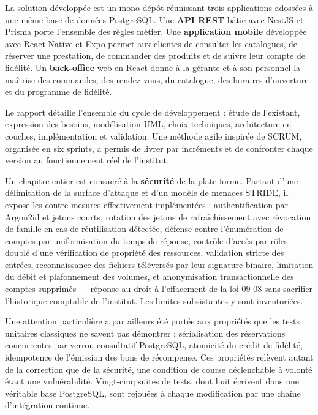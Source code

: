 \vspace{0.3cm}

La solution développée est un mono-dépôt réunissant trois applications
adossées à une même base de données PostgreSQL. Une \textbf{API REST} bâtie
avec NestJS et Prisma porte l'ensemble des règles métier. Une
\textbf{application mobile} développée avec React Native et Expo permet aux
clientes de consulter les catalogues, de réserver une prestation, de commander
des produits et de suivre leur compte de fidélité. Un \textbf{back-office} web
en React donne à la gérante et à son personnel la maîtrise des commandes, des
rendez-vous, du catalogue, des horaires d'ouverture et du programme de
fidélité.

\vspace{0.3cm}

Le rapport détaille l'ensemble du cycle de développement : étude de
l'existant, expression des besoins, modélisation UML, choix techniques,
architecture en couches, implémentation et validation. Une méthode agile
inspirée de SCRUM, organisée en six sprints, a permis de livrer par
incréments et de confronter chaque version au fonctionnement réel de
l'institut.

\vspace{0.3cm}

Un chapitre entier est consacré à la \textbf{sécurité} de la plate-forme.
Partant d'une délimitation de la surface d'attaque et d'un modèle de menaces
STRIDE, il expose les contre-mesures effectivement implémentées :
authentification par Argon2id et jetons courts, rotation des jetons de
rafraîchissement avec révocation de famille en cas de réutilisation détectée,
défense contre l'énumération de comptes par uniformisation du temps de réponse,
contrôle d'accès par rôles doublé d'une vérification de propriété des
ressources, validation stricte des entrées, reconnaissance des fichiers
téléversés par leur signature binaire, limitation du débit et plafonnement des
volumes, et anonymisation transactionnelle des comptes supprimés --- réponse au
droit à l'effacement de la loi 09-08 sans sacrifier l'historique comptable de
l'institut. Les limites subsistantes y sont inventoriées.

\vspace{0.3cm}

Une attention particulière a par ailleurs été portée aux propriétés que les
tests unitaires classiques ne savent pas démontrer : sérialisation des
réservations concurrentes par verrou consultatif PostgreSQL, atomicité du
crédit de fidélité, idempotence de l'émission des bons de récompense. Ces
propriétés relèvent autant de la correction que de la sécurité, une condition
de course déclenchable à volonté étant une vulnérabilité. Vingt-cinq suites de
tests, dont huit écrivent dans une véritable base PostgreSQL, sont rejouées à
chaque modification par une chaîne d'intégration continue.

